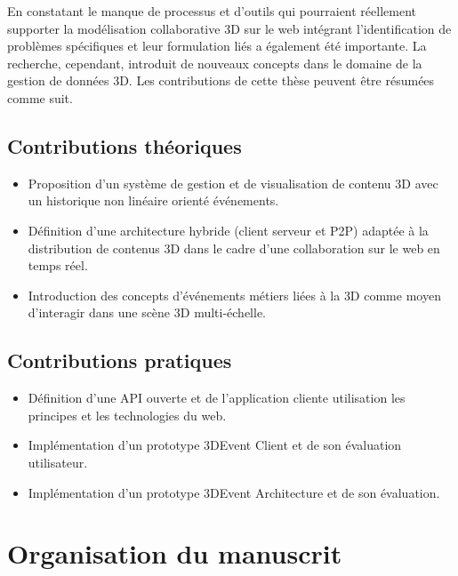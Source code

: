 En constatant le manque de processus et d'outils qui pourraient réellement supporter la modélisation collaborative \gls{3D} sur le web intégrant l'identification de problèmes spécifiques et leur formulation liés a également été importante. 
La recherche, cependant, introduit de nouveaux concepts dans le domaine de la gestion de 
données \gls{3D}. Les contributions de cette thèse peuvent être résumées comme 
suit.


\subsection{Contributions théoriques}

\begin{itemize}
	\item {}Proposition d'un système de 
	gestion et de visualisation de contenu \gls{3D} avec un historique non linéaire 
	orienté événements.
	\item Définition d'une architecture hybride (client serveur et \gls{P2P}) adaptée à 
	la distribution de contenus \gls{3D} dans le cadre d'une collaboration sur le web en 
	temps réel.
	\item Introduction des concepts d'événements métiers liées à la \gls{3D} 
	comme moyen d'interagir dans une scène \gls{3D} multi-échelle.
\end{itemize}
\subsection{Contributions pratiques}
\begin{itemize}
	\item {}Définition d'une API ouverte et 
	de l'application cliente utilisation les principes et les technologies du web.
	\item Implémentation d'un prototype 3DEvent Client et de son évaluation 
	utilisateur. 
	\item Implémentation d'un prototype 3DEvent Architecture et de son évaluation.
	
\end{itemize}


\section{Organisation du manuscrit}

